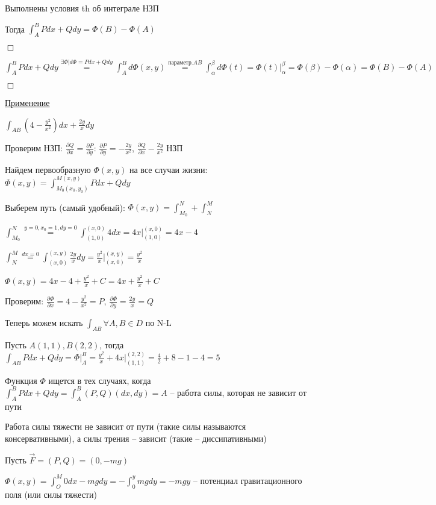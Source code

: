 \documentclass[12pt]{article}
\begin{document}
    Выполнены условия th об интеграле НЗП

    Тогда $\int_A^B Pdx + Qdy = \Phi(B) - \Phi(A)$

    $\Box$

    $\int_A^B Pdx + Qdy \stackrel{\exists \Phi | d\Phi = Pdx + Qdy}{=} \int_A^B d\Phi(x, y) \stackrel{\text{параметр.} AB}{=}
    \int_\alpha^\beta d\Phi(t) = \Phi(t) \Big|_\alpha^\beta = \Phi(\beta) - \Phi(\alpha) = \Phi(B) - \Phi(A)$

    $\Box$

    \underline{Применение}

    \Ex $\int_{AB} \left(4 - \frac{y^2}{x^2}\right)dx + \frac{2y}{x}dy$

    Проверим НЗП: $\frac{\partial Q}{\partial x} = \frac{\partial P}{\partial y}$: $\frac{\partial P}{\partial y} = -\frac{2y}{x^2}$, $\frac{\partial Q}{\partial x} -\frac{2y}{x^2}$ \Longleftrightarrow НЗП

    Найдем первообразную $\Phi(x, y)$ на все случаи жизни:
    $\Phi(x, y) = \int_{M_0(x_0, y_0)}^{M(x, y)} Pdx + Qdy$

    Выберем путь (самый удобный): $\Phi(x, y) = \int_{M_0}^{N} + \int_{N}^{M}$

    $\int_{M_0}^{N} \stackrel{y = 0, x_0 = 1, dy = 0}{=} \int_{(1, 0)}^{(x, 0)} 4 dx = 4x \Big|_{(1,0)}^{(x,0)} = 4x - 4$

    $\int_{N}^{M} \stackrel{dx = 0}{=} \int_{(x, 0)}^{(x, y)} \frac{2y}{x} dy = \frac{y^2}{x} \Big|_{(x,0)}^{(x,y)} = \frac{y^2}{x}$

    $\Phi(x, y) = 4x - 4 + \frac{y^2}{x} + C = 4x + \frac{y^2}{x} + C$

    Проверим: $\frac{\partial \Phi}{\partial x} = 4 - \frac{y^2}{x^2} = P$, $\frac{\partial \Phi}{\partial y} = \frac{2y}{x} = Q$

    Теперь можем искать $\int_{AB} \forall A, B \in D$ по N-L

    Пусть $A(1, 1), B(2, 2)$, тогда
    $\int_{AB} Pdx + Qdy = \Phi \Big|_A^B = \frac{y^2}{x} + 4x \Big|_{(1,1)}^{(2,2)} = \frac{4}{2} + 8 - 1 - 4 = 5$

    \Nota Функция $\Phi$ ищется в тех случаях, когда $\int_A^B Pdx + Qdy = \int^B_A (P, Q) (dx, dy) = A$ -- работа силы, которая не зависит от пути

    \Exs Работа силы тяжести не зависит от пути (такие силы называются консервативными), а силы трения -- зависит (такие -- диссипативными)

    \Ex Пусть $\vec{F} = (P, Q) = (0, -mg)$

    $\Phi(x, y) = \int_O^M 0dx - mgdy = -\int_0^y mgdy = -mgy$ -- потенциал гравитационного поля (или силы тяжести)
\end{document}
